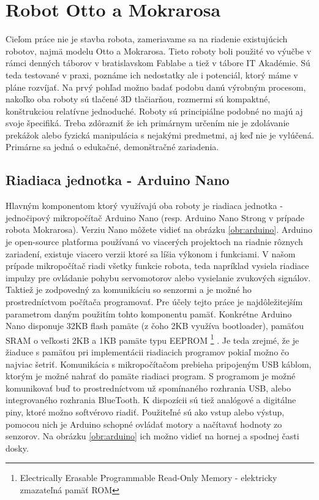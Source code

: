 \section{Robot Otto a Mokrarosa}
Cieľom práce nie je stavba robota, zameriavame sa na riadenie existujúcich robotov, najmä modelu Otto a Mokrarosa. Tieto roboty boli použité vo výučbe v rámci denných táborov v bratislavskom Fablabe a tiež v tábore IT Akadémie. Sú teda testované v praxi, poznáme ich nedostatky ale i potenciál, ktorý máme v pláne rozvíjať. Na prvý pohľad možno badať podobu danú výrobným procesom, nakoľko oba roboty sú tlačené 3D tlačiarňou, rozmermi sú kompaktné, konštrukciou relatívne jednoduché. Roboty sú principiálne podobné no majú aj svoje špecifiká. Treba zdôrazniť že ich primárnym určením nie je zdolávanie prekážok alebo fyzická manipulácia s nejakými predmetmi, aj keď nie je vylúčená. Primárne sa jedná o edukačné, demonštračné zariadenia.

\subsection{Riadiaca jednotka - Arduino Nano}
Hlavným komponentom ktorý využívajú oba roboty je riadiaca jednotka - jednočipový mikropočítač Arduino Nano (resp. Arduino Nano Strong v prípade robota Mokrarosa). Verziu Nano môžete vidieť na obrázku \ref{obr:arduino}. Arduino je open-source platforma používaná vo viacerých projektoch na riadnie rôznych zariadení, existuje viacero verzii ktoré sa líšia výkonom i funkciami. \cite{ArduinoConcept} V našom prípade mikropočítač riadi všetky funkcie robota, teda napríklad vysiela riadiace impulzy pre ovládanie pohybu servomotorov alebo vysielanie zvukových signálov. Taktiež je zodpovedný za komunikáciu so senzormi a je možné ho prostredníctvom počítača programovať. Pre účely tejto práce je najdôležitejším parametrom daným použitím tohto komponentu pamäť. Konkrétne Arduino Nano disponuje 32KB flash pamäte (z čoho 2KB využíva bootloader), pamäťou SRAM  o veľkosti 2KB a 1KB pamäte typu EEPROM \footnote{Electrically Erasable Programmable Read-Only Memory - elektricky zmazateľná pamäť ROM} \cite{ArduinoNanoSpecification}. Je teda zrejmé, že je žiaduce s pamäťou pri implementácii riadiacich programov pokiaľ možno čo najviac šetriť. Komunikácia s mikropočítačom prebieha pripojeným USB káblom, ktorým je možné nahrať do pamäte riadiaci program. S programom je možné komunikovať buď to prostredníctvom už spomínaného rozhrania USB, alebo integrovaného rozhrania BlueTooth. K dispozícii sú tiež analógové a digitálne piny, ktoré možno softvérovo riadiť. Použiteľné sú ako vstup alebo výstup, pomocou nich je Arduino schopné ovládať motory a načítavať hodnoty zo senzorov. Na obrázku \ref{obr:arduino} ich možno vidieť na hornej a spodnej časti dosky.

